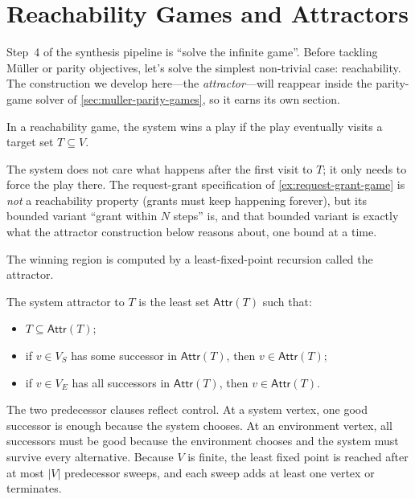 \section{Reachability Games and Attractors}
\label{sec:reachability-games}

Step~4 of the synthesis pipeline is ``solve the infinite game''.  Before
tackling M\"uller or parity objectives, let's solve the simplest
non-trivial case: reachability.  The construction we develop
here---the \emph{attractor}---will reappear inside the parity-game
solver of \cref{sec:muller-parity-games}, so it earns its own section.

\begin{definition}
\label{def:reachability-game}
In a reachability game, the system wins a play if the play eventually
visits a target set $T\subseteq V$.
\end{definition}

The system does not care what happens after the first visit to $T$; it
only needs to force the play there.  The request-grant specification of
\cref{ex:request-grant-game} is \emph{not} a reachability property
(grants must keep happening forever), but its bounded variant ``grant
within $N$ steps'' is, and that bounded variant is exactly what the
attractor construction below reasons about, one bound at a time.

The winning region is computed by a least-fixed-point recursion called
the attractor.

\begin{definition}[Attractor]
\label{def:attractor}
The system attractor to $T$ is the least set $\mathsf{Attr}(T)$ such
that:
\begin{itemize}[nosep]
  \item $T\subseteq \mathsf{Attr}(T)$;
  \item if $v\in V_S$ has some successor in $\mathsf{Attr}(T)$, then
        $v\in\mathsf{Attr}(T)$;
  \item if $v\in V_E$ has all successors in $\mathsf{Attr}(T)$, then
        $v\in\mathsf{Attr}(T)$.
\end{itemize}
\end{definition}

The two predecessor clauses reflect control.  At a system vertex, one
good successor is enough because the system chooses.  At an environment
vertex, all successors must be good because the environment chooses and
the system must survive every alternative.  Because $V$ is finite, the
least fixed point is reached after at most $|V|$ predecessor sweeps, and
each sweep adds at least one vertex or terminates.

